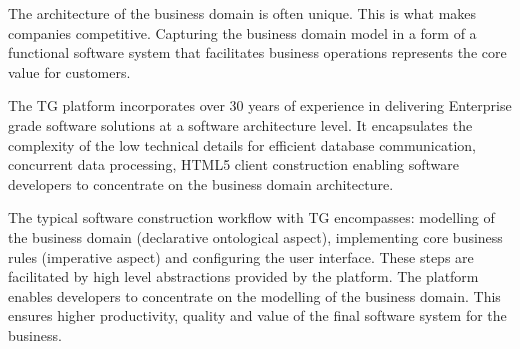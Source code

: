 \documentclass[a4paper,12pt,oneside,openright,final]{memoir} %
\begin{document}
  \vspace{3 mm}
  \noindent The architecture of the business domain is often unique. 
  This is what makes companies competitive.
  Capturing the business domain model in a form of a functional software system that facilitates business operations represents the core value for customers.
  
  \vspace{3 mm}
  \noindent The TG platform incorporates over 30 years of experience in delivering Enterprise grade software solutions at a software architecture level.
  It encapsulates the complexity of the low technical details for efficient database communication, concurrent data processing, HTML5 client construction enabling software developers to concentrate on the business domain architecture.

\begin{figure}[!h]
    \vspace{-5pt} 
    \centering    
    \vspace{0pt} 
  \end{figure}

  \noindent The typical software construction workflow with TG encompasses: modelling of the business domain (declarative ontological aspect), implementing core business rules (imperative aspect) and configuring the user interface.
  These steps are facilitated by high level abstractions provided by the platform.
  The platform enables developers to concentrate on the modelling of the business domain. 
  This ensures higher productivity, quality and value of the final software system for the business.
\end{document}
